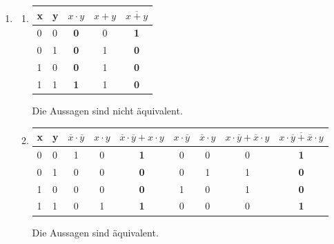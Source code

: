 \documentclass[a4paper]{article}
\begin{document}
	\begin{enumerate}
		\item
		\begin{enumerate}
			\item
			\begin{center}
				\begin{tabular}{|l|l|c|c|c|}
					\firsthline
						x & y & $x \cdot y$ & $x + y$ & $ \overline{x + y} $ \\
					\hline
						0 & 0 & \textbf{0} & 0 & \textbf{1} \\
						0 & 1 & \textbf{0} & 1 & \textbf{0} \\
						1 & 0 & \textbf{0} & 1 & \textbf{0} \\
						1 & 1 & \textbf{1} & 1 & \textbf{0} \\
					\hline
				\end{tabular}
			\end{center}
			Die Aussagen sind nicht äquivalent.
		
			\item
			\begin{center}
				\begin{tabular}{|l|l|c|c|c|c|c|c|c|}
					\firsthline
						x & y & $\overline{x} \cdot \overline{y}$ & $x \cdot y$ & $\overline{x} \cdot \overline{y} + x \cdot y$ & $ x \cdot \overline{y} $ & $ \overline{x} \cdot y $ & $ x \cdot \overline{y} + \overline{x} \cdot y $ & $ \overline{x \cdot \overline{y} + \overline{x} \cdot y} $ \\
					\hline
						0 & 0 & 1 & 0 & \textbf{1} & 0 & 0 & 0 & \textbf{1} \\
						0 & 1 & 0 & 0 & \textbf{0} & 0 & 1 & 1 & \textbf{0} \\
						1 & 0 & 0 & 0 & \textbf{0} & 1 & 0 & 1 & \textbf{0} \\
						1 & 1 & 0 & 1 & \textbf{1} & 0 & 0 & 0 & \textbf{1} \\
					\hline
				\end{tabular}
			\end{center}
			Die Aussagen sind äquivalent.
		

\end{enumerate}
\end{enumerate}
\end{document}
